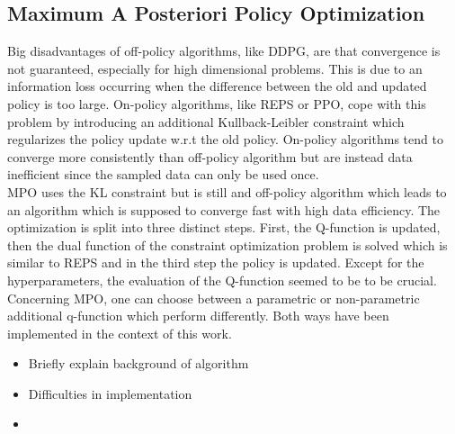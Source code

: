 \subsection{Maximum A Posteriori Policy Optimization}
Big disadvantages of off-policy algorithms, like DDPG, are that convergence is not guaranteed, especially for high dimensional problems. This is due to an information loss \cite{Peters2008a} occurring when the difference between the old and updated policy is too large. On-policy algorithms, like REPS or PPO, cope with this problem by introducing an additional Kullback-Leibler constraint which regularizes the policy update w.r.t the old policy. On-policy algorithms tend to converge more consistently than off-policy algorithm but are instead data inefficient since the sampled data can only be used once.\\
MPO \cite{Abdolmaleki2018a} uses the KL constraint but is still and off-policy algorithm which leads to an algorithm which is supposed to converge fast with high data efficiency.
The optimization is split into three distinct steps. First, the Q-function is updated, then the dual function of the constraint optimization problem is solved which is similar to REPS and in the third step the policy is updated. Except for the hyperparameters, the evaluation of the Q-function seemed to be to be crucial.\\
Concerning MPO, one can choose between a parametric or non-parametric additional q-function which perform differently. Both ways have been implemented in the context of this work.
\begin{itemize}
	\item Briefly explain background of algorithm
	\item Difficulties in implementation
	\item 
\end{itemize}